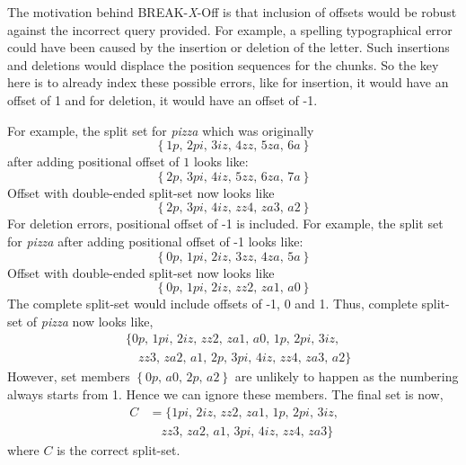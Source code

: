 The motivation behind BREAK-\textit{X}-Off is that inclusion of offsets would be robust against the incorrect query provided.
For example, a spelling typographical error could have been caused by the insertion or deletion of the letter. 
Such insertions and deletions would displace the position sequences for the chunks. 
So the key here is to already index these possible errors, like for insertion, it would have an offset of 1 and for deletion, it would have an offset of -1.

For example, the split set for \textit{pizza} which was originally $$\left\lbrace \textit{1p, 2pi, 3iz, 4zz, 5za, 6a} \right\rbrace$$ after adding positional offset of $1$ looks like: $$\left\lbrace \textit{2p, 3pi, 4iz, 5zz, 6za, 7a} \right\rbrace$$
Offset with double-ended split-set now looks like $$\left\lbrace \textit{2p, 3pi, 4iz, zz4, za3, a2} \right\rbrace$$
For deletion errors, positional offset of -1 is included.
For example, the split set for \textit{pizza} after adding positional offset of -1 looks like: $$\left\lbrace \textit{0p, 1pi, 2iz, 3zz, 4za, 5a} \right\rbrace$$
Offset with double-ended split-set now looks like $$\left\lbrace \textit{0p, 1pi, 2iz, zz2, za1, a0} \right\rbrace$$
The complete split-set would include offsets of -1, 0 and 1. 
Thus, complete split-set of \textit{pizza} now looks like,
\begin{equation*}
	\begin{aligned}
		&\lbrace \textit{0p, 1pi, 2iz, zz2, za1, a0, 1p, 2pi, 3iz,} \\ 
		&\quad \textit{zz3, za2, a1, 2p, 3pi, 4iz, zz4, za3, a2} \rbrace
	\end{aligned}
\end{equation*}
However, set members $\left\lbrace \textit{0p, a0, 2p, a2} \right\rbrace$ are unlikely to happen as the numbering always starts from 1.
Hence we can ignore these members.
The final set is now,
\begin{equation*}
	\begin{aligned}
		C &= \lbrace \textit{1pi, 2iz, zz2, za1, 1p, 2pi, 3iz,} \\ 
		&\quad \textit{zz3, za2, a1, 3pi, 4iz, zz4, za3} \rbrace
	\end{aligned}
\end{equation*}
where $C$ is the correct split-set. 


